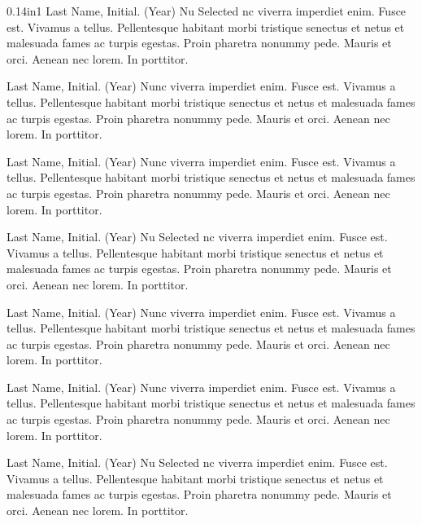 \documentclass[10pt]{article}
\begin{document}
\begin{hangparas}{0.14in}{1}
Last Name, Initial. (Year) Nu Selected nc viverra imperdiet enim. Fusce est. Vivamus a tellus. Pellentesque habitant morbi tristique senectus et netus et malesuada fames ac turpis egestas. Proin pharetra nonummy pede. Mauris et orci. Aenean nec lorem. In porttitor. 

Last Name, Initial. (Year) Nunc viverra imperdiet enim. Fusce est. Vivamus a tellus. Pellentesque habitant morbi tristique senectus et netus et malesuada fames ac turpis egestas. Proin pharetra nonummy pede. Mauris et orci. Aenean nec lorem. In porttitor. 

Last Name, Initial. (Year) Nunc viverra imperdiet enim. Fusce est. Vivamus a tellus. Pellentesque habitant morbi tristique senectus et netus et malesuada fames ac turpis egestas. Proin pharetra nonummy pede. Mauris et orci. Aenean nec lorem. In porttitor. 

Last Name, Initial. (Year) Nu Selected nc viverra imperdiet enim. Fusce est. Vivamus a tellus. Pellentesque habitant morbi tristique senectus et netus et malesuada fames ac turpis egestas. Proin pharetra nonummy pede. Mauris et orci. Aenean nec lorem. In porttitor. 

Last Name, Initial. (Year) Nunc viverra imperdiet enim. Fusce est. Vivamus a tellus. Pellentesque habitant morbi tristique senectus et netus et malesuada fames ac turpis egestas. Proin pharetra nonummy pede. Mauris et orci. Aenean nec lorem. In porttitor. 

Last Name, Initial. (Year) Nunc viverra imperdiet enim. Fusce est. Vivamus a tellus. Pellentesque habitant morbi tristique senectus et netus et malesuada fames ac turpis egestas. Proin pharetra nonummy pede. Mauris et orci. Aenean nec lorem. In porttitor.

Last Name, Initial. (Year) Nu Selected nc viverra imperdiet enim. Fusce est. Vivamus a tellus. Pellentesque habitant morbi tristique senectus et netus et malesuada fames ac turpis egestas. Proin pharetra nonummy pede. Mauris et orci. Aenean nec lorem. In porttitor.  

\end{hangparas}
\end{document}
